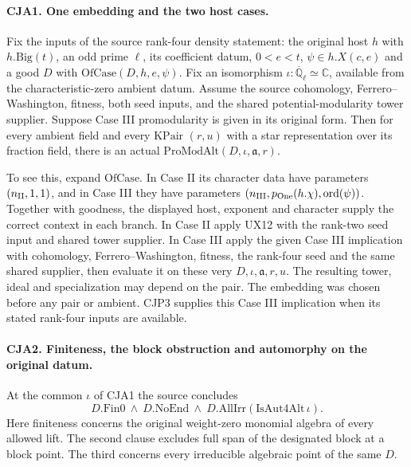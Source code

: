 \paragraph{CJA1. One embedding and the two host cases.}
Fix the inputs of the source rank-four density statement: the original
host $h$ with $h.\mathrm{Big}(t)$, an odd prime $\ell$, its coefficient
datum, $0<e<t$, $\psi\in h.X(c,e)$ and a good $D$ with
$\mathrm{OfCase}(D,h,e,\psi)$. Fix an isomorphism
$\iota:\overline{\mathbb Q}_\ell\simeq\mathbb C$, available from the
characteristic-zero ambient datum. Assume the source cohomology,
Ferrero--Washington, fitness, both seed inputs, and the shared
potential-modularity tower supplier. Suppose Case III promodularity is
given in its original form. Then for every ambient field and every
$\mathrm{KPair}$ $(r,u)$ with a star representation over its fraction
field, there is an actual $\mathrm{ProModAlt}(D,\iota,\mathfrak a,r)$.

To see this, expand $\mathrm{OfCase}$. In Case II its character data
have parameters $(n_{\rm II},1,1)$, and in Case III they have parameters
$(n_{\rm III},p_{\rm One}(h.\chi),\operatorname{ord}(\psi))$. Together
with goodness, the displayed host, exponent and character supply the
correct context in each branch. In Case II apply UX12 with the
rank-two seed input and shared tower supplier. In Case III apply the
given Case III implication with cohomology, Ferrero--Washington,
fitness, the rank-four seed and the same shared supplier, then evaluate
it on these very $D,\iota,\mathfrak a,r,u$. The resulting tower, ideal
and specialization may depend on the pair. The embedding was chosen
before any pair or ambient. CJP3 supplies this Case III implication
when its stated rank-four inputs are available.

\paragraph{CJA2. Finiteness, the block obstruction and automorphy on the original datum.}
At the common $\iota$ of CJA1 the source concludes
\[
 D.\mathrm{Fin0}\ \land\ D.\mathrm{NoEnd}\ \land\
 D.\mathrm{AllIrr}(\mathrm{IsAut4Alt}\,\iota).
\]
Here finiteness concerns the original weight-zero monomial algebra of
every allowed lift. The second clause excludes full span of the designated
block at a block point. The third concerns every irreducible algebraic
point of the same $D$.

